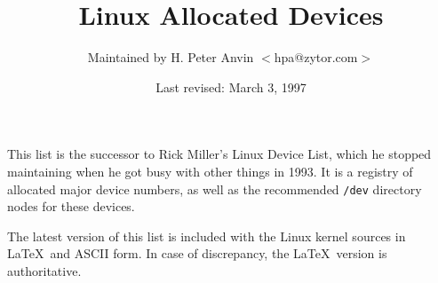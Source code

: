 %
%
\oddsidemargin=0in
\textwidth=6.5in
\topmargin=0in
\headheight=0.5in
\headsep=0.25in
\textheight=7.5in
\footskip=0.75in
\footheight=0.5in
%

\newcommand{\file}{\tt}			%
\newcommand{\hex}{\tt}			%
\newcommand{\ud}{(Under development)}	%
\newcommand{\1}{\({}^1\)}
\newcommand{\2}{\({}^2\)}
\newcommand{\3}{\({}^3\)}
\newcommand{\4}{\({}^4\)}
\newlength{\dig}
\settowidth{\dig}{0}			%
\newcommand{\num}[2]{\makebox[#1\dig][r]{#2}}
\newcommand{\major}[4]{\num{3}{#1}#2 \> #3 \> #4 \\}
\newcommand{\minor}[3]{\> \> \num{3}{#1} \> {\file #2} \> #3 \\}
\newcommand{\minordots}{\> \> \> \dots \\}
\newenvironment{devicelist}%
 {\begin{tabbing}%
000--000 \= blockxxx \= 000 \= {\file /dev/crambamboli} \= foo \kill}%
 {\end{tabbing}}
\newcommand{\link}[4]{{\file #1} \> {\file #2} \> #3 \> #4 \\}
\newcommand{\vlink}[4]{{\file #1} \> {\em #2 \/} \> #3 \> #4 \\}
\newcommand{\node}[3]{{\file #1} \> #2 \> #3 \\}
\newcommand{\tum}{$''$}
\newenvironment{nodelist}%
 {\begin{tabbing}%
{\file /dev/crambamboli} \= {\file /proc/self/fd/99} \= symbolicxxx \=
foo \kill}%
 {\end{tabbing}}
%
%
\title{{\bf Linux Allocated Devices}}
\author{Maintained by H. Peter Anvin $<$hpa@zytor.com$>$}
\date{Last revised: March 3, 1997}
\maketitle
%
\noindent
This list is the successor to Rick Miller's Linux Device List, which
he stopped maintaining when he got busy with other things in 1993.  It
is a registry of allocated major device numbers, as well as the
recommended {\file /dev} directory nodes for these devices.

The latest version of this list is included with the Linux kernel
sources in \LaTeX\ and ASCII form.  In case of discrepancy, the
\LaTeX\ version is authoritative.

